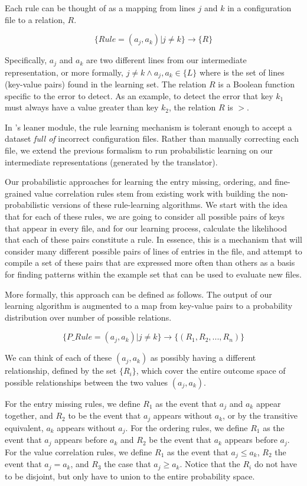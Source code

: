 Each rule can be thought of as a mapping from 
lines $j$ and $k$ in a configuration file to a relation, $R$.

\[
\{ Rule = (a_j, a_k) | j \neq k \} \rightarrow \{ R \}
\]

Specifically, $a_j$ and $a_k$ are two different lines from our
intermediate representation, or more formally, $j \neq k \land
a_j, a_k \in \{ L \}$ where is the set of lines (key-value pairs) found
in the learning set. The relation $R$
is a Boolean function specific to the error to detect. 
As an example, to detect the error that key $k_1$ must always 
have a value greater than key $k_2$, the relation $R$ is $>$.

In \app's leaner module, the rule learning mechanism is tolerant 
enough to accept a dataset {\em full of} incorrect configuration files.
Rather than manually correcting each file, 
we extend the previous formalism to run probabilistic learning
on our intermediate representations (generated by the translator). 

Our probabilistic approaches for learning the entry missing, 
ordering, and fine-grained value correlation rules stem 
from existing work with building 
the non-probabilistic versions of these rule-learning algorithms. 
We start with the idea that for each of these rules, 
we are going to consider all possible pairs of keys that appear in every 
file, and for our learning process, calculate the likelihood that each of 
these pairs constitute a rule. 
In essence, this is a mechanism that will consider many different possible 
pairs of lines of entries in the file, 
and attempt to compile a set of these pairs 
that are expressed more often than others as a basis for finding patterns 
within the example set that can be used to evaluate new files.

More formally, this approach can be defined as follows. 
The output of our learning algorithm is augmented to a map from 
key-value pairs to a probability distribution over number of possible 
relations.

\[
\{ P\_Rule = (a_j, a_k) | j \neq k \} \rightarrow \{ (R_1, R_2, ... , R_n) \}
\]

We can think of each of these $(a_j, a_k)$ as possibly having a different relationship, defined by the set $\{ R_i \}$, which cover the entire outcome space of possible relationships between the two values $(a_j, a_k)$.

For the entry missing rules, we define $R_1$ as the event that $a_j$ and
$a_k$ appear together, and $R_2$ to be the event that $a_j$ appears
without $a_k$, or by the transitive equivalent, $a_k$ appears without
$a_j$. For the ordering rules, we define $R_1$ as the event that
$a_j$ appears before $a_k$ and $R_2$ be the event that $a_k$ appears
before $a_j$. For the value correlation rules, we define $R_1$ as the
event that $a_j \leq a_k$, $R_2$ the event that $a_j = a_k$, and $R_3$
the case that $a_j \geq a_k$. Notice that the $R_i$ do not have to be
disjoint, but only have to union to the entire probability space.

